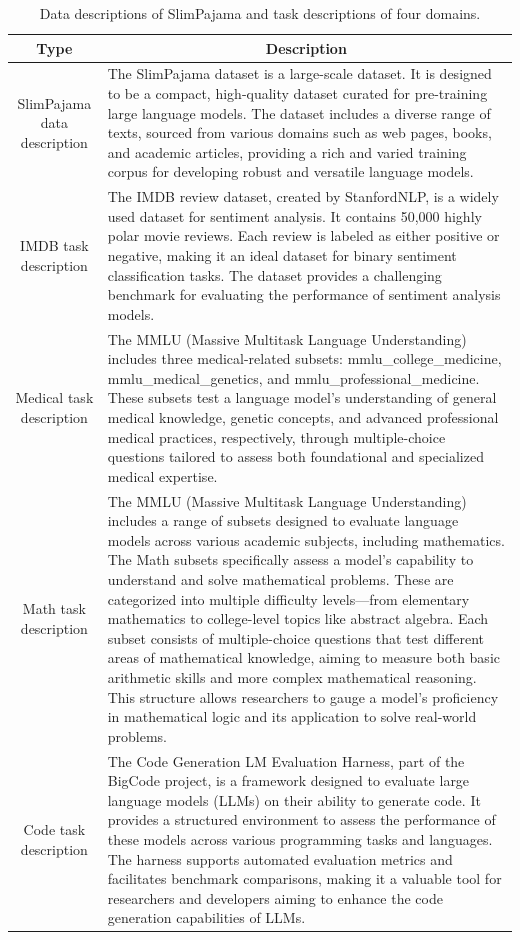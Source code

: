 \documentclass{article}
\newcommand{\mytiny}{\fontsize{8pt}{10pt}\selectfont}
\begin{document}
\begin{table}[H]
\centering
\mytiny
\begin{tabular}{c|p{11cm}}
\hline
\textbf{Type} & \multicolumn{1}{c}{\textbf{Description}} \\ \hline
SlimPajama data description & The SlimPajama dataset is a large-scale dataset. It is designed to be a compact, high-quality dataset curated for pre-training large language models. The dataset includes a diverse range of texts, sourced from various domains such as web pages, books, and academic articles, providing a rich and varied training corpus for developing robust and versatile language models. \\
\hline
IMDB task description & The IMDB review dataset, created by StanfordNLP, is a widely used dataset for sentiment analysis. It contains 50,000 highly polar movie reviews. Each review is labeled as either positive or negative, making it an ideal dataset for binary sentiment classification tasks. The dataset provides a challenging benchmark for evaluating the performance of sentiment analysis models. \\
\hline
Medical task description & The MMLU (Massive Multitask Language Understanding) includes three medical-related subsets: mmlu\_college\_medicine, mmlu\_medical\_genetics, and mmlu\_professional\_medicine. These subsets test a language model's understanding of general medical knowledge, genetic concepts, and advanced professional medical practices, respectively, through multiple-choice questions tailored to assess both foundational and specialized medical expertise. \\
\hline
Math task description & The MMLU (Massive Multitask Language Understanding) includes a range of subsets designed to evaluate language models across various academic subjects, including mathematics. The Math subsets specifically assess a model's capability to understand and solve mathematical problems. These are categorized into multiple difficulty levels—from elementary mathematics to college-level topics like abstract algebra. Each subset consists of multiple-choice questions that test different areas of mathematical knowledge, aiming to measure both basic arithmetic skills and more complex mathematical reasoning. This structure allows researchers to gauge a model's proficiency in mathematical logic and its application to solve real-world problems. \\
\hline
Code task description & The Code Generation LM Evaluation Harness, part of the BigCode project, is a framework designed to evaluate large language models (LLMs) on their ability to generate code. It provides a structured environment to assess the performance of these models across various programming tasks and languages. The harness supports automated evaluation metrics and facilitates benchmark comparisons, making it a valuable tool for researchers and developers aiming to enhance the code generation capabilities of LLMs. \\
\hline
\end{tabular}
\caption{Data descriptions of SlimPajama and task descriptions of four domains.}
\label{tab: task_description}
\end{table}
\endgroup
\end{document}
